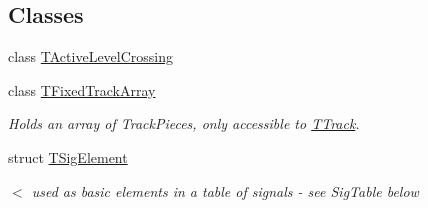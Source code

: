 \subsection*{Classes}
\begin{DoxyCompactItemize}
\item 
class \mbox{\hyperlink{class_t_track_1_1_t_active_level_crossing}{T\+Active\+Level\+Crossing}}
\item 
class \mbox{\hyperlink{class_t_track_1_1_t_fixed_track_array}{T\+Fixed\+Track\+Array}}
\begin{DoxyCompactList}\small\item\em Holds an array of Track\+Pieces, only accessible to \mbox{\hyperlink{class_t_track}{T\+Track}}. \end{DoxyCompactList}\item 
struct \mbox{\hyperlink{struct_t_track_1_1_t_sig_element}{T\+Sig\+Element}}
\begin{DoxyCompactList}\small\item\em $<$ used as basic elements in a table of signals -\/ see Sig\+Table below \end{DoxyCompactList}\end{DoxyCompactItemize}
